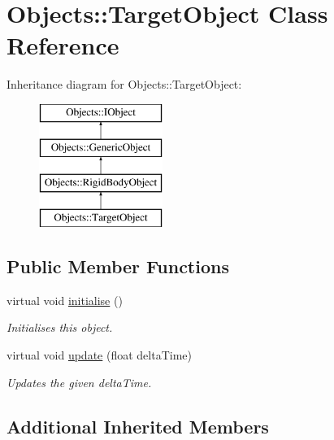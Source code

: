 \hypertarget{class_objects_1_1_target_object}{\section{Objects\-:\-:Target\-Object Class Reference}
\label{class_objects_1_1_target_object}
}
Inheritance diagram for Objects\-:\-:Target\-Object\-:\begin{figure}[H]
\begin{center}
\leavevmode
\includegraphics[height=4.000000cm]{class_objects_1_1_target_object}
\end{center}
\end{figure}
\subsection*{Public Member Functions}
\begin{DoxyCompactItemize}
\item 
\hypertarget{class_objects_1_1_target_object_adff3ad3f9d68c1c323ebcb06679c7549}{virtual void \hyperlink{class_objects_1_1_target_object_adff3ad3f9d68c1c323ebcb06679c7549}{initialise} ()}\label{class_objects_1_1_target_object_adff3ad3f9d68c1c323ebcb06679c7549}

\begin{DoxyCompactList}\small\item\em Initialises this object. \end{DoxyCompactList}\item 
virtual void \hyperlink{class_objects_1_1_target_object_a46b8163c5921925aa6d95fc0e99ce011}{update} (float delta\-Time)
\begin{DoxyCompactList}\small\item\em Updates the given delta\-Time. \end{DoxyCompactList}\end{DoxyCompactItemize}
\subsection*{Additional Inherited Members}


